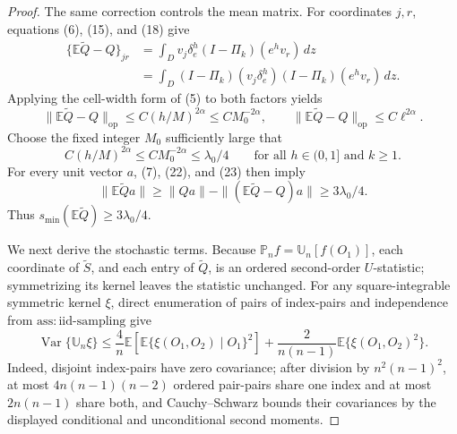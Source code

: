 \documentclass{article}
\begin{document}
\begin{proof}
The same correction controls the mean matrix.  For coordinates \(j,r\), equations (6), (15), and (18) give
\[
 \begin{split}
 \{\mathbb E\widetilde Q-Q\}_{jr}
 &=\int_Dv_j\delta_e^h(I-\Pi_k)(e^hv_r)\,dz\\
 &=\int_D(I-\Pi_k)(v_j\delta_e^h)(I-\Pi_k)(e^hv_r)\,dz.
 \end{split}
 \tag{21}
\]
Applying the cell-width form of (5) to both factors yields
\[
 \|\mathbb E\widetilde Q-Q\|_{\mathrm{op}}
 \leq C(h/M)^{2\alpha}\leq CM_0^{-2\alpha},
 \qquad
 \|\mathbb E\widetilde Q-Q\|_{\mathrm{op}}\leq C\ell^{2\alpha}.
 \tag{22}
\]
Choose the fixed integer \(M_0\) sufficiently large that
\[
 C(h/M)^{2\alpha}\leq CM_0^{-2\alpha}\leq\lambda_0/4
 \qquad\text{for all }h\in(0,1]\text{ and }k\geq1.
 \tag{23}
\]
For every unit vector \(a\), (7), (22), and (23) then imply
\[
 \|\mathbb E\widetilde Qa\|
 \geq\|Qa\|-\|(\mathbb E\widetilde Q-Q)a\|
 \geq3\lambda_0/4.
 \tag{24}
\]
Thus \(s_{\min}(\mathbb E\widetilde Q)\geq3\lambda_0/4\).

We next derive the stochastic terms.  Because \(\mathbb P_nf=\mathbb U_n[f(O_1)]\), each coordinate of \(\widetilde S\), and each entry of \(\widetilde Q\), is an ordered second-order \(U\)-statistic; symmetrizing its kernel leaves the statistic unchanged.  For any square-integrable symmetric kernel \(\xi\), direct enumeration of pairs of index-pairs and independence from \(\mathrm{ass:iid\mbox{-}sampling}\) give
\[
 \operatorname{Var}\{\mathbb U_n\xi\}
 \leq\frac4n\mathbb E\left[\mathbb E\{\xi(O_1,O_2)\mid O_1\}^2\right]
 +\frac{2}{n(n-1)}\mathbb E\{\xi(O_1,O_2)^2\}.
 \tag{25}
\]
Indeed, disjoint index-pairs have zero covariance; after division by \(n^2(n-1)^2\), at most \(4n(n-1)(n-2)\) ordered pair-pairs share one index and at most \(2n(n-1)\) share both, and Cauchy--Schwarz bounds their covariances by the displayed conditional and unconditional second moments.


\end{proof}
\end{document}
